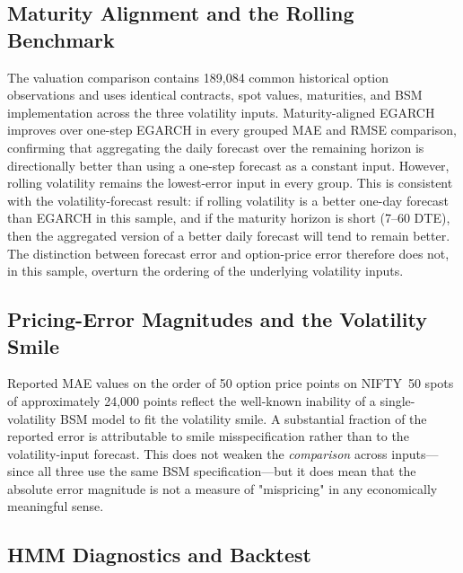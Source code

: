 \documentclass[journal]{IEEEtran}
\begin{document}
\subsection*{Maturity Alignment and the Rolling Benchmark}

The valuation comparison contains 189{,}084 common historical option observations and uses identical contracts, spot values, maturities, and BSM implementation across the three volatility inputs. Maturity-aligned EGARCH improves over one-step EGARCH in every grouped MAE and RMSE comparison, confirming that aggregating the daily forecast over the remaining horizon is directionally better than using a one-step forecast as a constant input. However, rolling volatility remains the lowest-error input in every group. This is consistent with the volatility-forecast result: if rolling volatility is a better one-day forecast than EGARCH in this sample, and if the maturity horizon is short (7--60 DTE), then the aggregated version of a better daily forecast will tend to remain better. The distinction between forecast error and option-price error therefore does not, in this sample, overturn the ordering of the underlying volatility inputs.

\subsection*{Pricing-Error Magnitudes and the Volatility Smile}

Reported MAE values on the order of 50 option price points on NIFTY~50 spots of approximately 24{,}000 points reflect the well-known inability of a single-volatility BSM model to fit the volatility smile. A substantial fraction of the reported error is attributable to smile misspecification rather than to the volatility-input forecast. This does not weaken the \emph{comparison} across inputs—since all three use the same BSM specification—but it does mean that the absolute error magnitude is not a measure of "mispricing" in any economically meaningful sense.

\subsection*{HMM Diagnostics and Backtest}
\end{document}
